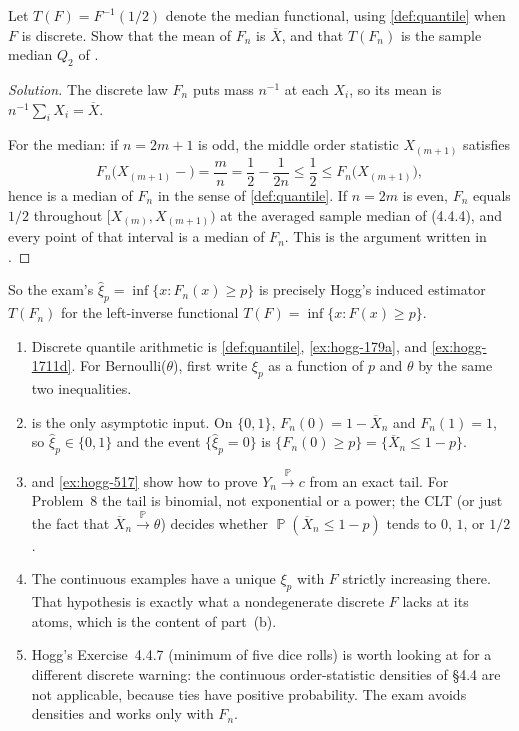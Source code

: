 \documentclass[11pt,a4paper]{article}
\DeclareMathOperator{\Pbb}{\mathbb{P}}
\begin{document}
\begin{exercise}
\label{ex:hogg-1013}
Let \(T(F)=F^{-1}(1/2)\) denote the median functional, using \cref{def:quantile} when \(F\) is discrete. Show that the mean of \(F_n\) is \(\overline{X}\), and that \(T(F_n)\) is the sample median \(Q_2\) of \citep[(4.4.4)]{hogg2019}.
\end{exercise}

\begin{proof}[Solution]
The discrete law \(F_n\) puts mass \(n^{-1}\) at each \(X_i\), so its mean is \(n^{-1}\sum_i X_i=\overline{X}\).

For the median: if \(n=2m+1\) is odd, the middle order statistic \(X_{(m+1)}\) satisfies
\[
F_n\bigl(X_{(m+1)}-\bigr)
=
\frac{m}{n}
=
\frac12-\frac{1}{2n}
\le
\frac12
\le
F_n\bigl(X_{(m+1)}\bigr),
\]
hence is a median of \(F_n\) in the sense of \cref{def:quantile}. If \(n=2m\) is even, \(F_n\) equals \(1/2\) throughout \([X_{(m)},X_{(m+1)})\) at the averaged sample median of (4.4.4), and every point of that interval is a median of \(F_n\). This is the argument written in \citep[Remark~10.1.1]{hogg2019}.
\end{proof}

So the exam's \(\hat{\xi}_p=\inf\{x:F_n(x)\ge p\}\) is precisely Hogg's induced estimator \(T(F_n)\) for the left-inverse functional \(T(F)=\inf\{x:F(x)\ge p\}\).

\begin{remark}
\label{rem:p8-hogg-map}
\begin{enumerate}[label=\textup{(\arabic*)}]
    \item
    Discrete quantile arithmetic is \cref{def:quantile}, \cref{ex:hogg-179a}, and \cref{ex:hogg-1711d}. For Bernoulli(\(\theta\)), first write \(\xi_p\) as a function of \(p\) and \(\theta\) by the same two inequalities.
    \item
     is the only asymptotic input. On \(\{0,1\}\), \(F_n(0)=1-\overline{X}_n\) and \(F_n(1)=1\), so \(\hat{\xi}_p\in\{0,1\}\) and the event \(\{\hat{\xi}_p=0\}\) is \(\{F_n(0)\ge p\}=\{\overline{X}_n\le 1-p\}\).
    \item
     and \cref{ex:hogg-517} show how to prove \(Y_n\xrightarrow{\Pbb}c\) from an exact tail. For Problem~8 the tail is binomial, not exponential or a power; the CLT (or just the fact that \(\overline{X}_n\xrightarrow{\Pbb}\theta\)) decides whether \(\Pbb(\overline{X}_n\le 1-p)\) tends to \(0\), \(1\), or \(1/2\).
    \item
    The continuous examples have a unique \(\xi_p\) with \(F\) strictly increasing there. That hypothesis is exactly what a nondegenerate discrete \(F\) lacks at its atoms, which is the content of part~(b).
    \item
    Hogg's Exercise~4.4.7 (minimum of five dice rolls) is worth looking at for a different discrete warning: the continuous order-statistic densities of \S4.4 are not applicable, because ties have positive probability. The exam avoids densities and works only with \(F_n\).
\end{enumerate}
\end{remark}
\end{document}

